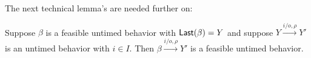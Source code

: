 The next technical lemma's are needed further on:



\begin{lemma}
\label{feasible plus input is feasible}
Suppose $\beta$ is a feasible untimed behavior with $\mathsf{Last}({\beta}) = Y$ and 
suppose $Y \xrightarrow{i/o, \rho} Y'$ is an untimed behavior with $i \in I$.
Then $\beta \xrightarrow{i/o, \rho} Y'$ is a feasible untimed behavior.
\end{lemma}

%

